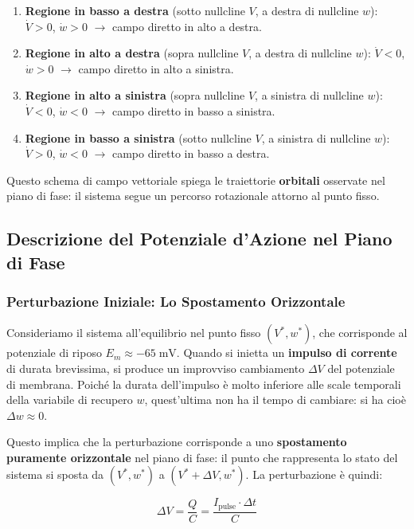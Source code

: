 \begin{enumerate}
    \item \textbf{Regione in basso a destra} (sotto nullcline $V$, a destra di nullcline $w$): $\dot{V} > 0$, $\dot{w} > 0$ $\rightarrow$ campo diretto in alto a destra.
    \item \textbf{Regione in alto a destra} (sopra nullcline $V$, a destra di nullcline $w$): $\dot{V} < 0$, $\dot{w} > 0$ $\rightarrow$ campo diretto in alto a sinistra.
    \item \textbf{Regione in alto a sinistra} (sopra nullcline $V$, a sinistra di nullcline $w$): $\dot{V} < 0$, $\dot{w} < 0$ $\rightarrow$ campo diretto in basso a sinistra.
    \item \textbf{Regione in basso a sinistra} (sotto nullcline $V$, a sinistra di nullcline $w$): $\dot{V} > 0$, $\dot{w} < 0$ $\rightarrow$ campo diretto in basso a destra.
\end{enumerate}

Questo schema di campo vettoriale spiega le traiettorie \textbf{orbitali} osservate nel piano di fase: il sistema segue un percorso rotazionale attorno al punto fisso.



\subsection{Descrizione del Potenziale d'Azione nel Piano di Fase}

\subsubsection{Perturbazione Iniziale: Lo Spostamento Orizzontale}

Consideriamo il sistema all'equilibrio nel punto fisso $(V^*, w^*)$, che corrisponde al potenziale di riposo $E_m \approx -65 \; \text{mV}$. Quando si inietta un \textbf{impulso di corrente} di durata brevissima, si produce un improvviso cambiamento $\Delta V$ del potenziale di membrana. Poiché la durata dell'impulso è molto inferiore alle scale temporali della variabile di recupero $w$, quest'ultima non ha il tempo di cambiare: si ha cioè $\Delta w \approx 0$.

Questo implica che la perturbazione corrisponde a uno \textbf{spostamento puramente orizzontale} nel piano di fase: il punto che rappresenta lo stato del sistema si sposta da $(V^*, w^*)$ a $(V^* + \Delta V, w^*)$. La perturbazione è quindi:

\begin{equation}
\Delta V = \frac{Q}{C} = \frac{I_{\text{pulse}} \cdot \Delta t}{C}
\end{equation}

